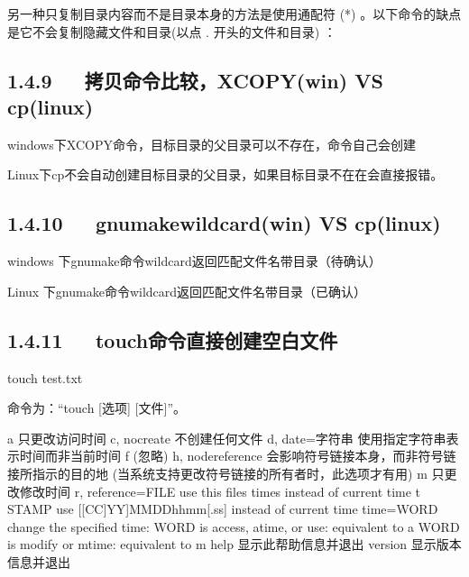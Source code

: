 \documentclass[letterpaper,12pt,english]{sphinxmanual}
\begin{document}
另一种只复制目录内容而不是目录本身的方法是使用通配符 (*) 。以下命令的缺点是它不会复制隐藏文件和目录(以点 . 开头的文件和目录) ：

\begin{sphinxVerbatim}[commandchars=\\\{\}]
   
\end{sphinxVerbatim}


\subsection{1.4.9   拷贝命令比较，XCOPY(win) VS cp(linux)}
\label{\detokenize{001software/001install/linux:xcopy-win-vs-cp-linux}}
windows下XCOPY命令，目标目录的父目录可以不存在，命令自己会创建

Linux下cp不会自动创建目标目录的父目录，如果目标目录不在在会直接报错。


\subsection{1.4.10   gnumake\sphinxhyphen{}wildcard(win) VS cp(linux)}
\label{\detokenize{001software/001install/linux:gnumake-wildcard-win-vs-cp-linux}}
windows 下gnumake命令wildcard返回匹配文件名带目录（待确认）

Linux 下gnumake命令wildcard返回匹配文件名带目录（已确认）


\subsection{1.4.11   touch命令直接创建空白文件}
\label{\detokenize{001software/001install/linux:id27}}

touch test.txt

命令为：“touch {[}选项{]} {[}文件{]}”。

\begin{sphinxVerbatim}[commandchars=\\\{\}]
\PYGZhy{}a   只更改访问时间
\PYGZhy{}c, \PYGZhy{}\PYGZhy{}no\PYGZhy{}create 不创建任何文件
\PYGZhy{}d, \PYGZhy{}\PYGZhy{}date=字符串 使用指定字符串表示时间而非当前时间
\PYGZhy{}f   (忽略)
\PYGZhy{}h, \PYGZhy{}\PYGZhy{}no\PYGZhy{}dereference  会影响符号链接本身，而非符号链接所指示的目的地
  (当系统支持更改符号链接的所有者时，此选项才有用)
\PYGZhy{}m   只更改修改时间
\PYGZhy{}r, \PYGZhy{}\PYGZhy{}reference=FILE  use this file\PYGZsq{}s times instead of current time
\PYGZhy{}t STAMP              use [[CC]YY]MMDDhhmm[.ss] instead of current time
    \PYGZhy{}\PYGZhy{}time=WORD        change the specified time:
                        WORD is access, atime, or use: equivalent to \PYGZhy{}a
                        WORD is modify or mtime: equivalent to \PYGZhy{}m
    \PYGZhy{}\PYGZhy{}help  显示此帮助信息并退出
    \PYGZhy{}\PYGZhy{}version  显示版本信息并退出
\end{sphinxVerbatim}
\end{document}
